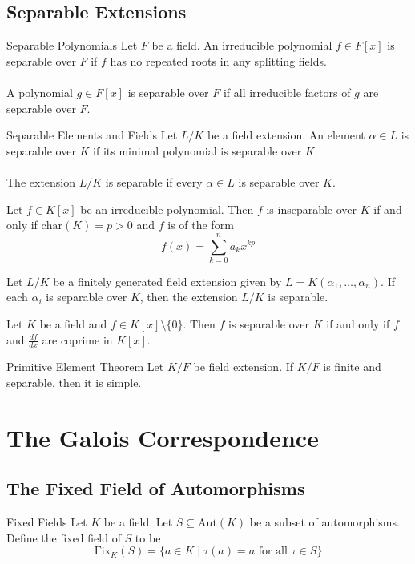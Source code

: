 \documentclass[a4paper]{article}
\begin{document}
\subsection{Separable Extensions}
\begin{defn}{Separable Polynomials}{} Let $F$ be a field. An irreducible polynomial $f\in F[x]$ is separable over $F$ if $f$ has no repeated roots in any splitting fields. \\~\\
A polynomial $g\in F[x]$ is separable over $F$ if all irreducible factors of $g$ are separable over $F$. 
\end{defn}

\begin{defn}{Separable Elements and Fields}{} Let $L/K$ be a field extension. An element $\alpha\in L$ is separable over $K$ if its minimal polynomial is separable over $K$. \\~\\
The extension $L/K$ is separable if every $\alpha\in L$ is separable over $K$. 
\end{defn}

\begin{prp}{}{} Let $f\in K[x]$ be an irreducible polynomial. Then $f$ is inseparable over $K$ if and only if $\text{char}(K)=p>0$ and $f$ is of the form $$f(x)=\sum_{k=0}^na_kx^{kp}$$
\end{prp}

\begin{prp}{}{} Let $L/K$ be a finitely generated field extension given by $L=K(\alpha_1,\dots,\alpha_n)$. If each $\alpha_i$ is separable over $K$, then the extension $L/K$ is separable. 
\end{prp}

\begin{lmm}{}{} Let $K$ be a field and $f\in K[x]\setminus\{0\}$. Then $f$ is separable over $K$ if and only if $f$ and $\frac{df}{dx}$ are coprime in $K[x]$. 
\end{lmm}

\begin{thm}{Primitive Element Theorem}{} Let $K/F$ be field extension. If $K/F$ is finite and separable, then it is simple. 
\end{thm}

\pagebreak
\section{The Galois Correspondence}
\subsection{The Fixed Field of Automorphisms}
\begin{defn}{Fixed Fields}{} Let $K$ be a field. Let $S\subseteq\text{Aut}(K)$ be a subset of automorphisms. Define the fixed field of $S$ to be $$\text{Fix}_K(S)=\{a\in K\;|\;\tau(a)=a\text{ for all }\tau\in S\}$$
\end{defn}
\end{document}
